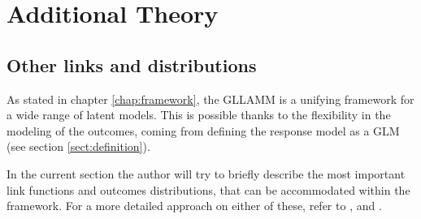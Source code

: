 \chapter{Additional Theory} \label{appA:additional}

\section{Other links and distributions} \label{appA1:links}
As stated in chapter \ref{chap:framework}, the GLLAMM is a unifying framework for a wide range of latent models. This is possible thanks to the flexibility in the modeling of the outcomes, coming from defining the response model as a GLM \cite{Nelder_et_al_1989} (see section \ref{sect:definition}). 

In the current section the author will try to briefly describe the most important link functions and outcomes distributions, that can be accommodated within the framework. For a more detailed approach on either of these, refer to \citet{Rabe_et_al_2004a, Rabe_et_al_2004b, Rabe_et_al_2004c, Skrondal_et_al_2004a}, and \citet{Rabe_et_al_2012}.\\


